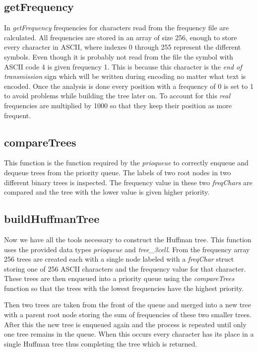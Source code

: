 \documentclass[a4paper,11pt,twoside]{article}
\begin{document}
\subsection{getFrequency}
In \emph{getFrequency}  frequencies for characters read from the frequency file are calculated.
All frequencies are stored in an array of size 256, enough to store every character in ASCII, where indexes 0 through 255 
represent the different symbols. Even though it is probably not read from the file the symbol with ASCII code 4 is given frequency 1. This is because this character is the \emph{end of transmission} sign which will be written during encoding no matter what text is encoded. Once the analysis is done every position with a frequency of 0 is set to 1 to avoid problems while
building the tree later on. To account for this \emph{real} frequencies are multiplied by 1000 so that they keep their position as more frequent.

\subsection{compareTrees}
This function is the function required by the \emph{prioqueue} to correctly enqueue and dequeue trees from the priority queue.
The labels of two root nodes in two different binary trees is inspected. The frequency value in these two \emph{freqChars} are compared and the tree with the lower value is given higher priority.

\subsection{buildHuffmanTree}
Now we have all the tools necessary to construct the Huffman tree. This function uses the provided data types \emph{prioqueue} and \emph{tree\_3cell}. From the frequency array 256 trees are created 
each with a single node labeled with a \emph{freqChar} struct storing one of 256 ASCII characters and the frequency value for that character. These trees are then enqueued into a priority queue using the \emph{compareTrees} function so that the trees with the lowest frequencies have the highest priority. 

Then two trees are taken from the front of the queue and merged into a new tree with a parent root node storing the sum of frequencies of these two smaller trees. After this the new tree is enqueued again and the process is repeated until only one tree remains in the queue. When this occurs every character has its place in a single Huffman tree thus completing the tree which is returned.
\end{document}
